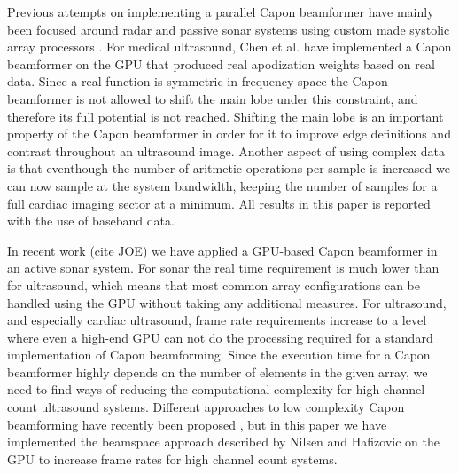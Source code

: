 \documentclass[journal]{IEEEtran}
\begin{document}
Previous attempts on implementing a parallel Capon beamformer have mainly been focused around radar and passive sonar systems using custom made systolic array processors \cite{McWhirter1989, Moonen1993, Sinha2002}.
For medical ultrasound, Chen et al. \cite{Chen2011a, Chen2011} have implemented a Capon beamformer on the GPU that produced real apodization weights based on real data. Since a real function is symmetric in frequency space the Capon beamformer is not allowed to shift the main lobe under this constraint, and therefore its full potential is not reached. Shifting the main lobe is an important property of the Capon beamformer in order for it to improve edge definitions and contrast throughout an ultrasound image. Another aspect of using complex data is that eventhough the number of aritmetic operations per sample is increased we can now sample at the system bandwidth, keeping the number of samples for a full cardiac imaging sector at a minimum. All results in this paper is reported with the use of baseband data.


In recent work (cite JOE) we have applied a GPU-based Capon beamformer in an active sonar system. For sonar the real time requirement is much lower than for ultrasound, which means that most common array configurations can be handled using the GPU without taking any additional measures. For ultrasound, and especially cardiac ultrasound, frame rate requirements increase to a level where even a high-end GPU can not do the processing required for a standard implementation of Capon beamforming. Since the execution time for a Capon beamformer highly depends on the number of elements in the given array, we need to find ways of reducing the computational complexity for high channel count ultrasound systems. Different approaches to low complexity Capon beamforming have recently been proposed \cite{Asl2012, Jensen2012}, but in this paper we have implemented the beamspace approach described by Nilsen and Hafizovic \cite{Nilsen2009} on the GPU to increase frame rates for high channel count systems.  
\end{document}
